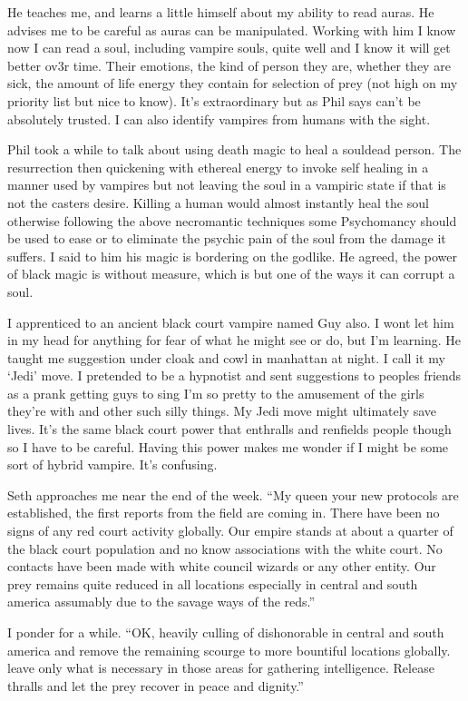He teaches me, and learns a little himself about my ability to read auras. He advises me to be careful as auras can be manipulated. Working with him I know now I can read a soul, including vampire souls, quite well and I know it will get better ov3r time. Their emotions, the kind of person they are, whether they are sick, the amount of life energy they contain for selection of prey (not high on my priority list but nice to know). It's extraordinary but as Phil says can't be absolutely trusted. I can also identify vampires from humans with the sight.

Phil took a while to talk about using death magic to heal a souldead person. The resurrection then quickening with ethereal energy to invoke self healing in a manner used by vampires but not leaving the soul in a vampiric state if that is not the casters desire. Killing a human would almost instantly heal the soul otherwise following the above necromantic techniques some Psychomancy should be used to ease or to eliminate the psychic pain of the soul from the damage it suffers. I said to him his magic is bordering on the godlike. He agreed, the power of black magic is without measure, which is but one of the ways it can corrupt a soul.

I apprenticed to an ancient black court vampire named Guy also. I wont let him in my head for anything for fear of what he might see or do, but I'm learning. He taught me suggestion under cloak and cowl in manhattan at night. I call it my `Jedi' move. I pretended to be a hypnotist and sent suggestions to peoples friends as a prank getting guys to sing I'm so pretty to the amusement of the girls they're with and other such silly things. My Jedi move might ultimately save lives. It's the same black court power that enthralls and renfields people though so I have to be careful. Having this power makes me wonder if I might be some sort of hybrid vampire. It's confusing.

Seth approaches me near the end of the week. ``My queen your new protocols are established, the first reports from the field are coming in. There have been no signs of any red court activity globally. Our empire stands at about a quarter of the black court population and no know associations with the white court. No contacts have been made with white council wizards or any other entity. Our prey remains quite reduced in all locations especially in central and south america assumably due to the savage ways of the reds.''

I ponder for a while. ``OK, heavily culling of dishonorable in central and south america and remove the remaining scourge to more bountiful locations globally. leave only what is necessary in those areas for gathering intelligence. Release thralls and let the prey recover in peace and dignity.''

